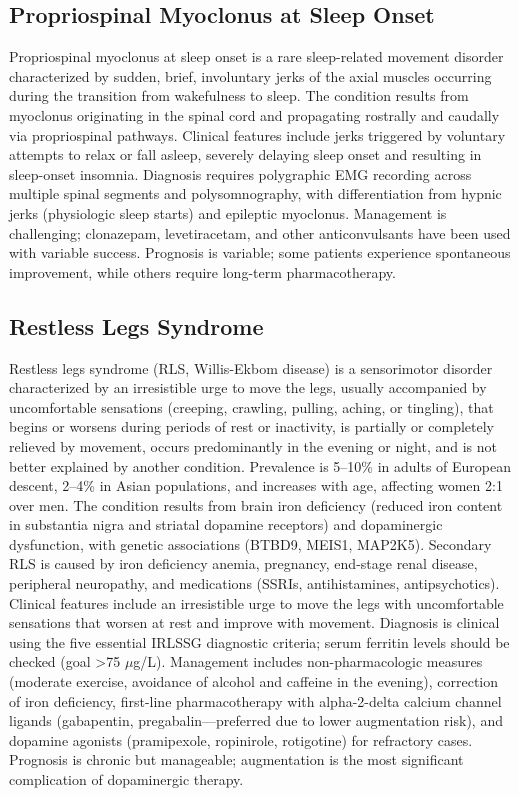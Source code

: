 \subsection{Propriospinal Myoclonus at Sleep Onset}
\label{sec:Propriospinal Myoclonus at Sleep Onset}
Propriospinal myoclonus at sleep onset is a rare sleep-related movement disorder characterized by sudden, brief, involuntary jerks of the axial muscles occurring during the transition from wakefulness to sleep. The condition results from myoclonus originating in the spinal cord and propagating rostrally and caudally via propriospinal pathways. Clinical features include jerks triggered by voluntary attempts to relax or fall asleep, severely delaying sleep onset and resulting in sleep-onset insomnia. Diagnosis requires polygraphic EMG recording across multiple spinal segments and polysomnography, with differentiation from hypnic jerks (physiologic sleep starts) and epileptic myoclonus. Management is challenging; clonazepam, levetiracetam, and other anticonvulsants have been used with variable success. Prognosis is variable; some patients experience spontaneous improvement, while others require long-term pharmacotherapy.

\subsection{Restless Legs Syndrome}
\label{sec:Restless Legs Syndrome}
Restless legs syndrome (RLS, Willis-Ekbom disease) is a sensorimotor disorder characterized by an irresistible urge to move the legs, usually accompanied by uncomfortable sensations (creeping, crawling, pulling, aching, or tingling), that begins or worsens during periods of rest or inactivity, is partially or completely relieved by movement, occurs predominantly in the evening or night, and is not better explained by another condition. Prevalence is 5--10\% in adults of European descent, 2--4\% in Asian populations, and increases with age, affecting women 2:1 over men. The condition results from brain iron deficiency (reduced iron content in substantia nigra and striatal dopamine receptors) and dopaminergic dysfunction, with genetic associations (BTBD9, MEIS1, MAP2K5). Secondary RLS is caused by iron deficiency anemia, pregnancy, end-stage renal disease, peripheral neuropathy, and medications (SSRIs, antihistamines, antipsychotics). Clinical features include an irresistible urge to move the legs with uncomfortable sensations that worsen at rest and improve with movement. Diagnosis is clinical using the five essential IRLSSG diagnostic criteria; serum ferritin levels should be checked (goal >75 $\mu$g/L). Management includes non-pharmacologic measures (moderate exercise, avoidance of alcohol and caffeine in the evening), correction of iron deficiency, first-line pharmacotherapy with alpha-2-delta calcium channel ligands (gabapentin, pregabalin---preferred due to lower augmentation risk), and dopamine agonists (pramipexole, ropinirole, rotigotine) for refractory cases. Prognosis is chronic but manageable; augmentation is the most significant complication of dopaminergic therapy.


